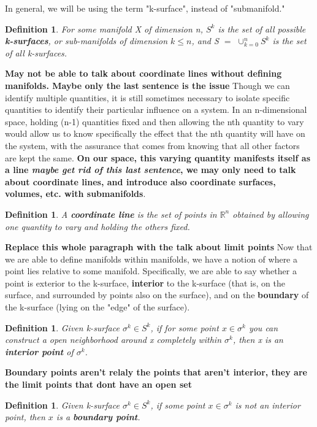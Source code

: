 \documentclass{book}
\newtheorem{defn}[equation]{Definition}
\begin{document}
In general, we will be using the term "k-surface", instead of "submanifold." 


\begin{defn}
	For some manifold X of dimension n, $S^k$ is the set of all possible \textbf{k-surfaces}, or sub-manifolds of dimension $k \leq n$, and S $=$ $\cup^n_{k=0}S^k$ is the set of all k-surfaces. 
\end{defn}

\textbf{May not be able to talk about coordinate lines without defining manifolds. Maybe only the last sentence is the issue}
Though we can identify multiple quantities, it is still sometimes necessary to isolate specific quantities to identify their particular influence on a system. In an n-dimensional space, holding (n-1) quantities fixed and then allowing the nth quantity to vary would allow us to know specifically the effect that the nth quantity will have on the system, with the assurance that comes from knowing that all other factors are kept the same. \textbf{On our space, this varying quantity manifests itself as a line \textit{maybe get rid of this last sentence}, we may only need to talk about coordinate lines, and introduce also coordinate surfaces, volumes, etc. with submanifolds}. 

\begin{defn}
	A \textbf{coordinate line} is the set of points in $\mathbb{R}^n$ obtained by allowing one quantity to vary and holding the others fixed. 
\end{defn}

\textbf{Replace this whole paragraph with the talk about limit points}
Now that we are able to define manifolds within manifolds, we have a notion of where a point lies relative to some manifold. Specifically, we are able to say whether a point is exterior to the k-surface, \textbf{interior} to the k-surface (that is, on the surface, and surrounded by points also on the surface), and on the \textbf{boundary} of the k-surface (lying on the "edge" of the surface).  


\begin{defn}
	Given k-surface $\sigma^k \in S^k$, if for some point $x \in \sigma^k$ you can construct a open neighborhood around x completely within $\sigma^k$, then x is an \textbf{interior point} of $\sigma^k$. 
\end{defn}


\textbf{Boundary points aren't relaly the points that aren't interior, they are the limit points that dont have an open set}
\begin{defn}
	Given k-surface $\sigma^k \in S^k$, if some point $x \in \sigma^k$ is not an interior point, then $x$ is a \textbf{boundary point}.
\end{defn}
\end{document}
